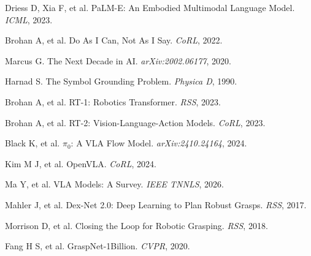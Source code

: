 \documentclass[12pt,a4paper]{article}
\begin{document}
\noindent[1] Driess D, Xia F, et al. PaLM-E: An Embodied Multimodal Language Model. \textit{ICML}, 2023.

\noindent[2] Brohan A, et al. Do As I Can, Not As I Say. \textit{CoRL}, 2022.

\noindent[3] Marcus G. The Next Decade in AI. \textit{arXiv:2002.06177}, 2020.

\noindent[4] Harnad S. The Symbol Grounding Problem. \textit{Physica D}, 1990.

\noindent[5] Brohan A, et al. RT-1: Robotics Transformer. \textit{RSS}, 2023.

\noindent[6] Brohan A, et al. RT-2: Vision-Language-Action Models. \textit{CoRL}, 2023.

\noindent[7] Black K, et al. $\pi_0$: A VLA Flow Model. \textit{arXiv:2410.24164}, 2024.

\noindent[8] Kim M J, et al. OpenVLA. \textit{CoRL}, 2024.

\noindent[9] Ma Y, et al. VLA Models: A Survey. \textit{IEEE TNNLS}, 2026.

\noindent[31] Mahler J, et al. Dex-Net 2.0: Deep Learning to Plan Robust Grasps. \textit{RSS}, 2017.

\noindent[32] Morrison D, et al. Closing the Loop for Robotic Grasping. \textit{RSS}, 2018.

\noindent[33] Fang H S, et al. GraspNet-1Billion. \textit{CVPR}, 2020.
\end{document}
